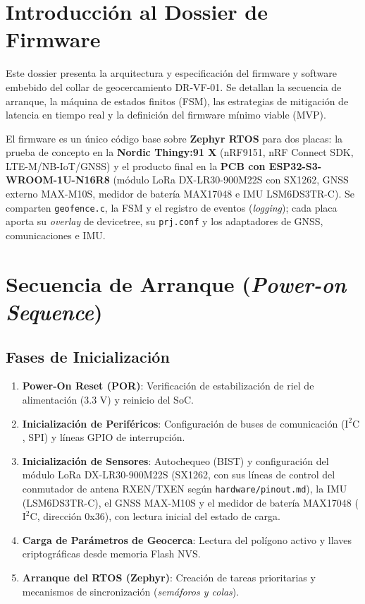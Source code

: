 \section{Introducción al Dossier de Firmware}

Este dossier presenta la arquitectura y especificación del firmware y software embebido del collar de geocercamiento DR-VF-01. Se detallan la secuencia de arranque, la máquina de estados finitos (FSM), las estrategias de mitigación de latencia en tiempo real y la definición del firmware mínimo viable (MVP).

El firmware es un único código base sobre \textbf{Zephyr RTOS} para dos placas: la prueba de concepto en la \textbf{Nordic Thingy:91 X} (nRF9151, nRF Connect SDK, LTE-M/NB-IoT/GNSS) y el producto final en la \textbf{PCB con ESP32-S3-WROOM-1U-N16R8} (módulo LoRa DX-LR30-900M22S con SX1262, GNSS externo MAX-M10S, medidor de batería MAX17048 e IMU LSM6DS3TR-C). Se comparten \texttt{geofence.c}, la FSM y el registro de eventos (\emph{logging}); cada placa aporta su \emph{overlay} de devicetree, su \texttt{prj.conf} y los adaptadores de GNSS, comunicaciones e IMU.

\section{Secuencia de Arranque (\textit{Power-on Sequence})}

\subsection{Fases de Inicialización}

\begin{enumerate}[leftmargin=*]
    \item \textbf{Power-On Reset (POR)}: Verificación de estabilización de riel de alimentación ($3.3\text{ V}$) y reinicio del SoC.
    \item \textbf{Inicialización de Periféricos}: Configuración de buses de comunicación ($\text{I}^2\text{C}$, SPI) y líneas GPIO de interrupción.
    \item \textbf{Inicialización de Sensores}: Autochequeo (BIST) y configuración del módulo LoRa DX-LR30-900M22S (SX1262, con sus líneas de control del conmutador de antena RXEN/TXEN según \texttt{hardware/pinout.md}), la IMU (LSM6DS3TR-C), el GNSS MAX-M10S y el medidor de batería MAX17048 ($\text{I}^2\text{C}$, dirección 0x36), con lectura inicial del estado de carga.
    \item \textbf{Carga de Parámetros de Geocerca}: Lectura del polígono activo y llaves criptográficas desde memoria Flash NVS.
    \item \textbf{Arranque del RTOS (Zephyr)}: Creación de tareas prioritarias y mecanismos de sincronización (\textit{semáforos y colas}).
\end{enumerate}

